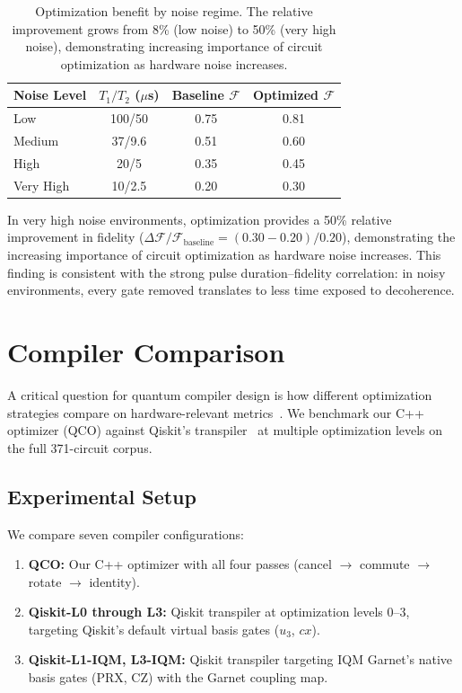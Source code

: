 \documentclass[sigconf,nonacm]{acmart}
\newcommand{\fid}{\mathcal{F}}
\begin{document}
\begin{table}[t]
\centering
\caption{Optimization benefit by noise regime. The relative improvement grows from 8\% (low noise) to 50\% (very high noise), demonstrating increasing importance of circuit optimization as hardware noise increases.}
\label{tab:noise}
\begin{tabular}{lccc}
\toprule
Noise Level & $T_1/T_2$ ($\mu$s) & Baseline $\fid$ & Optimized $\fid$ \\
\midrule
Low & 100/50 & 0.75 & 0.81 \\
Medium & 37/9.6 & 0.51 & 0.60 \\
High & 20/5 & 0.35 & 0.45 \\
Very High & 10/2.5 & 0.20 & 0.30 \\
\bottomrule
\end{tabular}
\end{table}

In very high noise environments, optimization provides a 50\% relative improvement in fidelity ($\Delta\fid/\fid_{\text{baseline}} = (0.30 - 0.20)/0.20$), demonstrating the increasing importance of circuit optimization as hardware noise increases. This finding is consistent with the strong pulse duration--fidelity correlation: in noisy environments, every gate removed translates to less time exposed to decoherence.

\section{Compiler Comparison}
\label{sec:compiler}

A critical question for quantum compiler design is how different optimization strategies compare on hardware-relevant metrics~\cite{li2023qasmbench}. We benchmark our C++ optimizer (QCO) against Qiskit's transpiler~\cite{qiskit2024} at multiple optimization levels on the full 371-circuit corpus.

\subsection{Experimental Setup}

We compare seven compiler configurations:
\begin{enumerate}
    \item \textbf{QCO:} Our C++ optimizer with all four passes (cancel $\to$ commute $\to$ rotate $\to$ identity).
    \item \textbf{Qiskit-L0 through L3:} Qiskit transpiler at optimization levels 0--3, targeting Qiskit's default virtual basis gates ($u_3$, $cx$).
    \item \textbf{Qiskit-L1-IQM, L3-IQM:} Qiskit transpiler targeting IQM Garnet's native basis gates (PRX, CZ) with the Garnet coupling map.
\end{enumerate}
\end{document}
